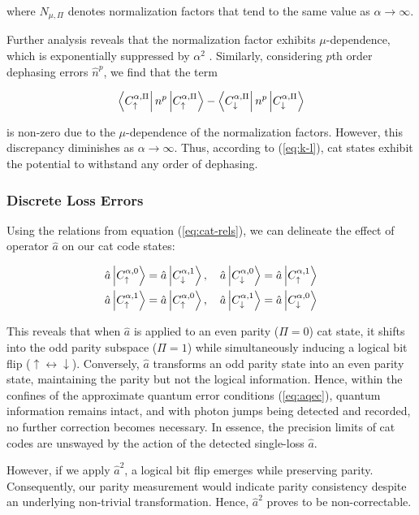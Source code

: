 \documentclass[11pt]{article}
\newcommand\0{\mathbf{0}}
\newcommand\<{\langle}
\renewcommand\>{\rangle}
\begin{document}
where $N_{\mu, \Pi}$ denotes normalization factors that tend to the same value as $\alpha \rightarrow \infty$. 

Further analysis reveals that the normalization factor exhibits $\mu$-dependence, which is exponentially suppressed by $\alpha^2$ \cite{albert2018multimode}. Similarly, considering $p$th order dephasing errors $\hat{n}^p$, we find that the term

$$
\bra{C^{\alpha, \Pi}_{\uparrow}} n^p \ket{C^{\alpha, \Pi}_{\uparrow}} - \bra{C^{\alpha, \Pi}_{\downarrow}} n^p \ket{C^{\alpha, \Pi}_{\downarrow}}
$$ 

is non-zero due to the $\mu$-dependence of the normalization factors. However, this discrepancy diminishes as $\alpha \rightarrow \infty$. Thus, according to (\ref{eq:k-l}), cat states exhibit the potential to withstand any order of dephasing.


\subsubsection{Discrete Loss Errors}

Using the relations from equation (\ref{eq:cat-rels}), we can delineate the effect of operator $\hat{a}$ on our cat code states:

\begin{align*}
\hat{a} \ket{C^{\alpha, 0}_{\uparrow}} &= \hat{a} \ket{C^{\alpha, 1}_{\downarrow}}, \quad
\hat{a} \ket{C^{\alpha, 0}_{\downarrow}} = \hat{a} \ket{C^{\alpha, 1}_{\uparrow}} \\
\hat{a} \ket{C^{\alpha, 1}_{\uparrow}} &= \hat{a} \ket{C^{\alpha, 0}_{\uparrow}}, \quad
\hat{a} \ket{C^{\alpha, 1}_{\downarrow}} = \hat{a} \ket{C^{\alpha, 0}_{\downarrow}}
\end{align*}

This reveals that when $\hat{a}$ is applied to an even parity ($\Pi = 0$) cat state, it shifts into the odd parity subspace ($\Pi = 1$) while simultaneously inducing a logical bit flip ($\uparrow \leftrightarrow \downarrow$). Conversely, $\hat{a}$ transforms an odd parity state into an even parity state, maintaining the parity but not the logical information. Hence, within the confines of the approximate quantum error conditions (\ref{eq:aqec}), quantum information remains intact, and with photon jumps being detected and recorded, no further correction becomes necessary. In essence, the precision limits of cat codes are unswayed by the action of the detected single-loss $\hat{a}$.

However, if we apply $\hat{a}^2$, a logical bit flip emerges while preserving parity. Consequently, our parity measurement would indicate parity consistency despite an underlying non-trivial transformation. Hence, $\hat{a}^2$ proves to be non-correctable.
\end{document}
